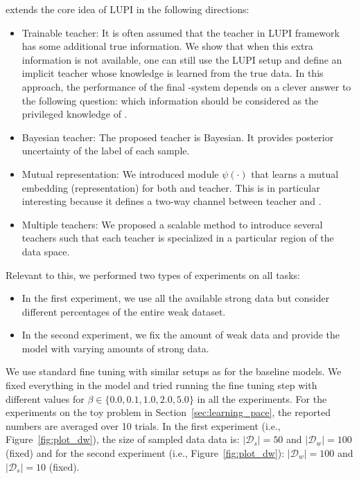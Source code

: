 \fwl extends the core idea of LUPI in the following directions:
\begin{itemize}[leftmargin=*]%
\setlength{\topsep}{0.1pt}
\setlength{\partopsep}{0.1pt}
\setlength{\itemsep}{0.1pt}
\setlength{\parskip}{0.1pt}
\setlength{\parsep}{0.1pt}
    \item Trainable teacher: It is often assumed that the teacher in LUPI framework has some additional true information. We show that when this extra information is not available, one can still use the LUPI setup and define an implicit teacher whose knowledge is learned from the true data. In this approach, the performance of the final \std-\tch system depends on a clever answer to the following question: which information should be considered as the privileged knowledge of \tch.
  \item Bayesian teacher: The proposed teacher is Bayesian. It provides posterior uncertainty of the label of each sample.
  \item Mutual representation: We introduced module $\psi(\cdot)$ that learns a mutual embedding (representation) for both \std and teacher. This is in particular interesting because it defines a two-way channel between teacher and \std. 
  \item Multiple teachers: We proposed a scalable method to introduce several teachers such that each teacher is specialized in a particular region of the data space.
\end{itemize}


Relevant to this, we performed two types of experiments on all tasks:
%
\begin{itemize}
    \item In the first experiment, we use all the available strong data but consider different percentages of the entire weak dataset.
    \item In the second experiment, we fix the amount of weak data and provide the model with varying amounts of strong data.
\end{itemize} 
We use standard fine tuning with similar setups as for the baseline models. 
We fixed everything in the model and tried running the fine tuning step with different values for $\beta \in \{0.0, 0.1, 1.0, 2.0, 5.0\}$ in all the experiments.
For the experiments on the toy problem in Section~\ref{sec:learning_pace}, the reported numbers are averaged over 10 trials. In the first experiment (i.e., Figure~\ref{fig:plot_dw}), the size of sampled data data is: $|\mathcal{D}_s| = 50$ and $|\mathcal{D}_w| = 100$ (fixed) and for the second experiment (i.e., Figure~\ref{fig:plot_dw}): $|\mathcal{D}_w| = 100$ and $|\mathcal{D}_s| = 10$ (fixed). 

